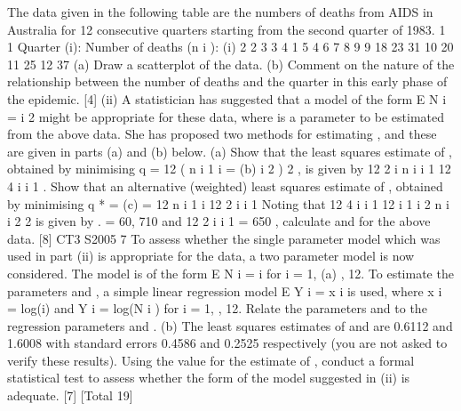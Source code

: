 \documentclass[a4paper,12pt]{article}
\begin{document}
The data given in the following table are the numbers of deaths from AIDS in
Australia for 12 consecutive quarters starting from the second quarter of 1983.
1
1
Quarter (i):
Number of deaths (n i ):
(i)
2
2
3
3
4
1
5
4
6 7 8 9
9 18 23 31
10
20
11
25
12
37
(a) Draw a scatterplot of the data.
(b) Comment on the nature of the relationship between the number of
deaths and the quarter in this early phase of the epidemic.
[4]
(ii)
A statistician has suggested that a model of the form
E N i = i 2
might be appropriate for these data, where is a parameter to be estimated
from the above data. She has proposed two methods for estimating , and
these are given in parts (a) and (b) below.
(a)
Show that the least squares estimate of , obtained by minimising
q =
12
( n
i 1 i
=
(b)
i 2 ) 2 , is given by
12 2
i n i
i 1
12 4
i
i 1
.
Show that an alternative (weighted) least squares estimate of ,
obtained by minimising q * =
(c)
= 12
n
i 1 i
12 2
i
i 1
Noting that 12 4
i
i 1
12
i 1
i 2
n i
i 2
2
is given by
.
= 60, 710 and
12 2
i
i 1
= 650 , calculate
and
for the above data.
[8]
CT3 S2005
7
To assess whether the single parameter model which was used in part (ii) is
appropriate for the data, a two parameter model is now considered. The model
is of the form
E N i = i
for i = 1,
(a)
, 12.
To estimate the parameters and , a simple linear regression model
E Y i =
x i
is used, where x i = log(i) and Y i = log(N i ) for i = 1, , 12. Relate the
parameters and to the regression parameters and .
(b)
The least squares estimates of and are 0.6112 and 1.6008 with standard errors 0.4586 and 0.2525 respectively (you are not asked to
verify these results). Using the value for the estimate of , conduct a formal statistical test to assess whether the form of the model suggested in (ii) is adequate.
[7]
[Total 19]
\end{document}
